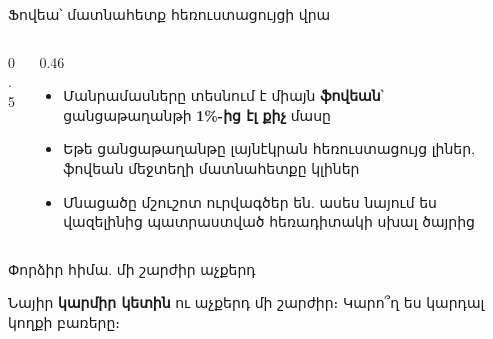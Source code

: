 \begin{frame}{Ֆովեա՝ մատնահետք հեռուստացույցի վրա}
  \begin{columns}[c]
    \begin{column}{0.5\textwidth}
      \centering
      
    \end{column}
    \begin{column}{0.46\textwidth}
      \begin{itemize}
        \item Մանրամասները տեսնում է միայն \textbf{ֆովեան}՝ ցանցաթաղանթի \textbf{1\%-ից էլ քիչ} մասը
        \item<2-> Եթե ցանցաթաղանթը լայնէկրան հեռուստացույց լիներ, ֆովեան մեջտեղի մատնահետքը կլիներ
        \item<3-> Մնացածը մշուշոտ ուրվագծեր են. ասես նայում ես վազելինից պատրաստված հեռադիտակի սխալ ծայրից
      \end{itemize}
    \end{column}
  \end{columns}
\end{frame}

\begin{frame}{Փորձիր հիմա. մի շարժիր աչքերդ}
  \begin{tryit}
    Նայիր \textbf{կարմիր կետին} ու աչքերդ մի շարժիր։ Կարո՞ղ ես կարդալ կողքի բառերը։
  \end{tryit}
  \vspace{2mm}
  \par
  \vspace{2mm}
\end{frame}

